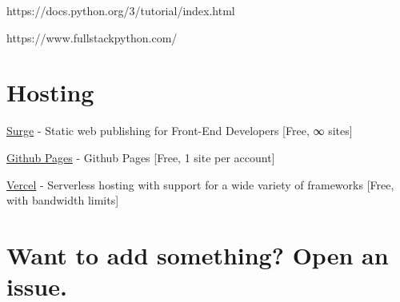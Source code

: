 https://docs.python.org/3/tutorial/index.html

https://www.fullstackpython.com/

\hypertarget{hosting}{%
\section{Hosting}\label{hosting}}

\href{https://surge.sh/}{Surge} - Static web publishing for Front-End
Developers {[}Free, ∞ sites{]}

\href{https://pages.github.com/}{Github Pages} - Github Pages {[}Free, 1
site per account{]}

\href{vercel.com}{Vercel} - Serverless hosting with support for a wide
variety of frameworks {[}Free, with bandwidth limits{]}

\hypertarget{want-to-add-something-open-an-issue.}{%
\section{Want to add something? Open an
issue.}\label{want-to-add-something-open-an-issue.}}
